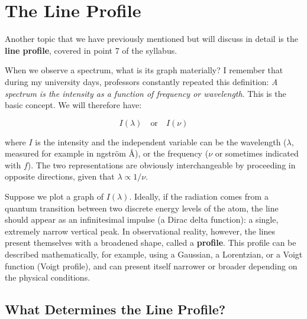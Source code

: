 \section{The Line Profile}

Another topic that we have previously mentioned but will discuss in detail is the \textbf{line profile}, covered in point 7 of the syllabus.

When we observe a spectrum, what is its graph materially?
I remember that during my university days, professors constantly repeated this definition: \textit{A spectrum is the intensity as a function of frequency or wavelength}.
This is the basic concept. We will therefore have:

\begin{equation}
I(\lambda) \quad \text{or} \quad I(\nu)
\end{equation}

where $I$ is the intensity and the independent variable can be the wavelength ($\lambda$, measured for example in \text{\AA}ngström $\text{\AA}$), or the frequency ($\nu$ or sometimes indicated with $f$). The two representations are obviously interchangeable by proceeding in opposite directions, given that $\lambda \propto 1/\nu$.

Suppose we plot a graph of $I(\lambda)$. Ideally, if the radiation comes from a quantum transition between two discrete energy levels of the atom, the line should appear as an infinitesimal impulse (a Dirac delta function): a single, extremely narrow vertical peak.
In observational reality, however, the lines present themselves with a broadened shape, called a \textbf{profile}. This profile can be described mathematically, for example, using a Gaussian, a Lorentzian, or a Voigt function (Voigt profile), and can present itself narrower or broader depending on the physical conditions.

\subsection{What Determines the Line Profile?}

